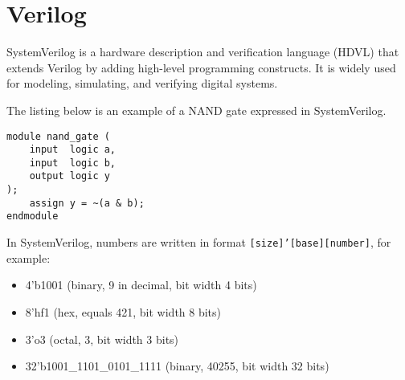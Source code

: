 \section{Verilog}

SystemVerilog is a hardware description and verification language 
(HDVL) that extends Verilog by adding high-level programming constructs. 
It is widely used for modeling, simulating, and verifying digital 
systems.

The listing below is an example of a NAND gate expressed in SystemVerilog.

\begin{lstlisting}[caption={NAND}, label={lst:nand_gate}]
module nand_gate (
    input  logic a,
    input  logic b,
    output logic y
);
    assign y = ~(a & b);
endmodule
\end{lstlisting}

In SystemVerilog, numbers are written in format
\texttt{[size]'[base][number]}, for example:
\begin{itemize}
    \item 4'b1001 (binary, 9 in decimal, bit width 4 bits)
    \item 8'hf1 (hex, equals 421, bit width 8 bits)
    \item 3'o3 (octal, 3, bit width 3 bits)
    \item 32'b1001\_1101\_0101\_1111 (binary, 40255, bit width 32 bits)
\end{itemize}

